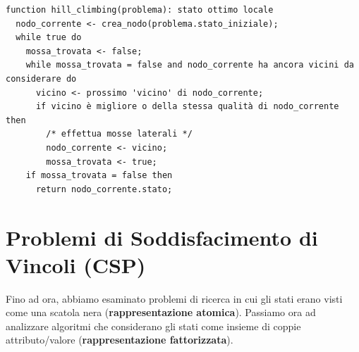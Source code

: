 \documentclass[a4paper,11pt]{report}
\begin{document}
\begin{lstlisting}[caption={Hill-climbing con prima scelta}]
function hill_climbing(problema): stato ottimo locale
  nodo_corrente <- crea_nodo(problema.stato_iniziale);
  while true do
    mossa_trovata <- false;
    while mossa_trovata = false and nodo_corrente ha ancora vicini da considerare do
      vicino <- prossimo 'vicino' di nodo_corrente;
      if vicino è migliore o della stessa qualità di nodo_corrente then
        /* effettua mosse laterali */
        nodo_corrente <- vicino;
        mossa_trovata <- true;
    if mossa_trovata = false then
      return nodo_corrente.stato;
\end{lstlisting}


\chapter{Problemi di Soddisfacimento di Vincoli (CSP)}
Fino ad ora, abbiamo esaminato problemi di ricerca in cui gli stati erano visti come una scatola nera (\textbf{rappresentazione atomica}). Passiamo ora ad analizzare algoritmi che considerano gli stati come insieme di coppie attributo/valore (\textbf{rappresentazione fattorizzata}).
\end{document}
